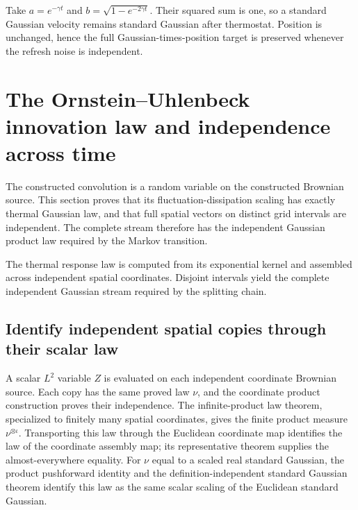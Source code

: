 \documentclass[11pt,a4paper]{report}
\begin{document}
Take \(a=e^{-\gamma t}\) and \(b=\sqrt{1-e^{-2\gamma t}}\). Their squared sum is one, so a standard Gaussian velocity remains standard Gaussian after thermostat. Position is unchanged, hence the full Gaussian-times-position target is preserved whenever the refresh noise is independent.

\section{\texorpdfstring{The Ornstein–Uhlenbeck innovation law and independence across time}{The Ornstein–Uhlenbeck innovation law and independence across time}}
\label{proof-module-KineticLangevin-OUMarginal-lean}


The constructed convolution is a random variable on the constructed Brownian source. This section proves that its fluctuation-dissipation scaling has exactly thermal Gaussian law, and that full spatial vectors on distinct grid intervals are independent. The complete stream therefore has the independent Gaussian product law required by the Markov transition.



The thermal response law is computed from its exponential kernel and assembled across independent spatial coordinates. Disjoint intervals yield the complete independent Gaussian stream required by the splitting chain.

\subsection{\texorpdfstring{Identify independent spatial copies through their scalar law}{Identify independent spatial copies through their scalar law}}
\label{report-step-KineticLangevin-OUMarginal-lean-1}


A scalar \(L^{2}\) variable \(Z\) is evaluated on each independent coordinate Brownian source. Each copy has the same proved law \(\nu\), and the coordinate product construction proves their independence. The infinite-product law theorem, specialized to finitely many spatial coordinates, gives the finite product measure \(\nu^{\otimes\iota}\). Transporting this law through the Euclidean coordinate map identifies the law of the coordinate assembly map; its representative theorem supplies the almost-everywhere equality. For \(\nu\) equal to a scaled real standard Gaussian, the product pushforward identity and the definition-independent standard Gaussian theorem identify this law as the same scalar scaling of the Euclidean standard Gaussian.
\end{document}

